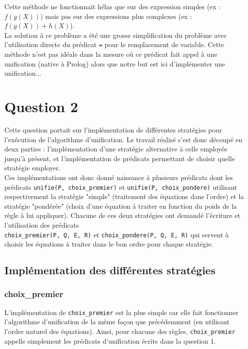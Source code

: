 \documentclass[12pt]{article} %
\begin{document}
Cette méthode ne fonctionnait hélas que sur des expression simples (ex : $f(g(X))$) mais pas sur des expressions plus complexes (ex : $f(g(X))+h(X)$).\\

La solution à ce problème a été une grosse simplification du problème avec l'utilisation directe du prédicat \verb|=| pour le remplacement de variable. Cette méthode n'est pas idéale dans la mesure où ce prédicat fait appel à une unification (native à Prolog) alors que notre but est ici d'implémenter une unification...

\section*{Question 2}

Cette question portait sur l'implémentation de différentes stratégies pour l'exécution de l'algorithme d'unification. Le travail réalisé s'est donc découpé en deux parties : l'implémentation d'une stratégie alternative à celle employée jusqu'à présent, et l'implé\-mentation de prédicats permettant de choisir quelle stratégie employer.\\

Ces implémentations ont donc donné naissance à plusieurs prédicats dont les prédicats \verb|unifie(P, choix_premier)| et \verb|unifie(P, choix_pondere)| utilisant respectivement la stratégie "simple" (traitement des équations dans l'ordre) et la stratégie "pondérée" (choix d'une équation à traiter en fonction du poids de la règle à lui appliquer). Chacune de ces deux stratégies ont demandé l'écriture et l'utilisation des prédicats\\\verb|choix_premier(P, Q, E, R)| et \verb|choix_pondere(P, Q, E, R)| qui servent à choisir les équations à traiter dans le bon ordre pour chaque stratégie.

\subsection*{Implémentation des différentes stratégies}

\subsubsection*{choix\_premier}

L'implémentation de \verb|choix_premier| est la plus simple car elle fait fonctionner l'algorithme d'unification de la même façon que précédemment (en utilisant l'ordre naturel des équations). Ainsi, pour chacune des règles, \verb|choix_premier| appelle simplement les prédicats d'unification écrits dans la question 1.\\
\end{document}

